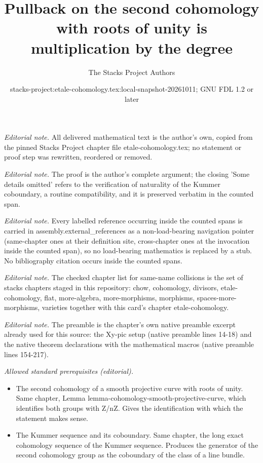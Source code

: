 \documentclass[10pt,a4paper]{amsart}
\title{Pullback on the second cohomology with roots of unity is multiplication by the degree}
\author{The Stacks Project Authors}
\date{stacks-project:etale-cohomology.tex:local-snapshot-20261011; GNU FDL 1.2 or later}
\theoremstyle{plain}
\theoremstyle{definition}
\theoremstyle{remark}
\numberwithin{equation}{subsection}
\begin{document}
\maketitle
\noindent\textit{Editorial note.} All delivered mathematical text is the author's own, copied from the pinned Stacks Project chapter file etale-cohomology.tex; no statement or proof step was rewritten, reordered or removed.\par\medskip
\noindent\textit{Editorial note.} The proof is the author's complete argument; the closing 'Some details omitted' refers to the verification of naturality of the Kummer coboundary, a routine compatibility, and it is preserved verbatim in the counted span.\par\medskip
\noindent\textit{Editorial note.} Every labelled reference occurring inside the counted spans is carried in assembly.external\_references as a non-load-bearing navigation pointer (same-chapter ones at their definition site, cross-chapter ones at the invocation inside the counted span), so no load-bearing mathematics is replaced by a stub. No bibliography citation occurs inside the counted spans.\par\medskip
\noindent\textit{Editorial note.} The checked chapter list for same-name collisions is the set of stacks chapters staged in this repository: chow, cohomology, divisors, etale-cohomology, flat, more-algebra, more-morphisms, morphisms, spaces-more-morphisms, varieties together with this card's chapter etale-cohomology.\par\medskip
\noindent\textit{Editorial note.} The preamble is the chapter's own native preamble excerpt already used for this source: the Xy-pic setup (native preamble lines 14-18) and the native theorem declarations with the mathematical macros (native preamble lines 154-217).\par\medskip
\noindent\textit{Allowed standard prerequisites (editorial).}\begin{itemize}
\item The second cohomology of a smooth projective curve with roots of unity. Same chapter, Lemma lemma-cohomology-smooth-projective-curve, which identifies both groups with Z/nZ. Gives the identification with which the statement makes sense.
\item The Kummer sequence and its coboundary. Same chapter, the long exact cohomology sequence of the Kummer sequence. Produces the generator of the second cohomology group as the coboundary of the class of a line bundle.
\end{itemize}\medskip
\end{document}
